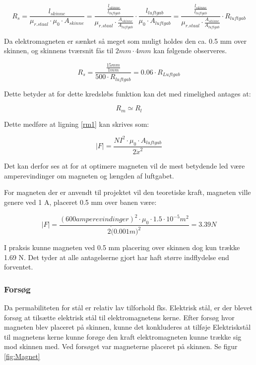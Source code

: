 \begin{equation}
R_s =  \frac{l_{skinne}}{\mu_{r.staal} \cdot \mu_0 \cdot A_{skinne} }
=
\frac{
	\frac{l_{skinne}}{l_{luftgab}} }{\mu_{r.staal} \cdot \frac{A_{skinne}}{A_{luftgab}} }\cdot \frac{l_{luftgab}}{\mu_0 \cdot A_{luftgab}}=\frac{
	\frac{l_{skinne}}{l_{luftgab}} }
	{\mu_{r.staal}\cdot\frac{A_{skinne}}{A_{luftgab}}}\cdot R_{luftgab}
\end{equation}


Da elektromagneten er sænket så meget som muligt holdes den ca. 0.5 mm over skinnen, og skinnens tværsnit fås til $2mm \cdot 4mm$ kan følgende observeres.

\begin{equation}
R_s =
\frac{\frac{15 mm}{1 mm} }
{ 500 \cdot R_{luftgab} }= 0.06\cdot R_{Luftgab}
	\end{equation}

Dette betyder at for dette kredsløbs funktion kan det med rimelighed antages at:

\begin{equation}
R_m \simeq R_l
	\end{equation}

Dette medføre at ligning \ref{rm1} kan skrives som:

\begin{equation}
\mid F \mid = \frac{NI^2 \cdot \mu_0 \cdot A_{luftgab} } {2 \dot x^2}
\end{equation}

Det kan derfor ses at for at optimere magneten vil de mest betydende led være amperevindinger om magneten og længden af luftgabet.

For magneten der er anvendt til projektet vil den teoretiske kraft, magneten ville genere ved 1 A, placeret 0.5 mm over banen være: %

\begin{equation}
\mid F \mid = \frac{(600 amperevindinger)^2 \cdot \mu_0 \cdot 1.5 \cdot 10^{-5} m^2 } {2 \dot (0.001m)^2} = 3.39 N
\end{equation}

I praksis kunne magneten ved 0.5 mm placering over skinnen dog kun trække  1.69 N. Det tyder at alle antagelserne gjort har haft større indflydelse end forventet.

\subsubsection{Forsøg}
Da permabiliteten for stål er relativ lav tilforhold fks. Elektrisk stål, er der blevet forsøg at tilsætte elektrisk stål til elektromagnetens kerne. Efter forsøg hvor magneten blev placeret på skinnen, kunne det konkluderes at tilføje Elektriskstål til magnetens kerne kunne forøge den kraft elektromagneten kunne trække sig mod skinnen med.
Ved forsøget var magneterne placeret på skinnen. Se figur \ref{fig:Magnet}

